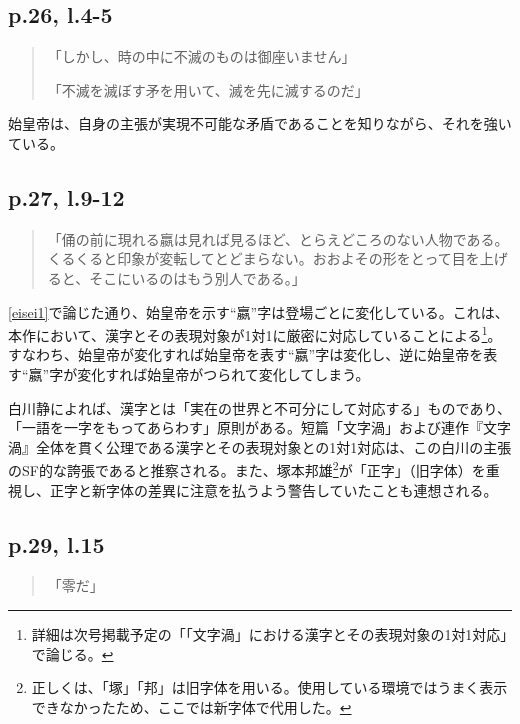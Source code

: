 \documentclass[10pt, a5paper, twoside]{jsarticle}
\theoremstyle{definition}
\begin{document}
		\subsection{p.26, l.4-5}

		\begin{quote}

			「しかし、時の中に不滅のものは御座いません」
		
			「不滅を滅ぼす矛を用いて、滅を先に滅するのだ」

		\end{quote}

		始皇帝は、自身の主張が実現不可能な矛盾であることを知りながら、それを強いている。

		\subsection{p.27, l.9-12}

		\begin{quote}

			「俑の前に現れる嬴は見れば見るほど、とらえどころのない人物である。くるくると印象が変転してとどまらない。おおよその形をとって目を上げると、そこにいるのはもう別人である。」

		\end{quote}

		\ref{eisei1}で論じた通り、始皇帝を示す“嬴”字は登場ごとに変化している。これは、本作において、漢字とその表現対象が1対1に厳密に対応していることによる\footnote{詳細は次号掲載予定の「「文字渦」における漢字とその表現対象の1対1対応」で論じる。}。すなわち、始皇帝が変化すれば始皇帝を表す“嬴”字は変化し、逆に始皇帝を表す“嬴”字が変化すれば始皇帝がつられて変化してしまう。

		白川静によれば、漢字とは「実在の世界と不可分にして対応する」ものであり、「一語を一字をもってあらわす」原則がある\cite{kanji}。短篇「文字渦」および連作『文字渦』全体を貫く公理である漢字とその表現対象との1対1対応は、この白川の主張のSF的な誇張であると推察される。また、塚本邦雄\footnote{正しくは、「塚」「邦」は旧字体を用いる。使用している環境ではうまく表示できなかったため、ここでは新字体で代用した。}が「正字」（旧字体）を重視し、正字と新字体の差異に注意を払うよう警告していた\cite{tsuka}ことも連想される。

		\subsection{p.29, l.15}

		\begin{quote}
			
			「零だ」
		
		\end{quote}
\end{document}
